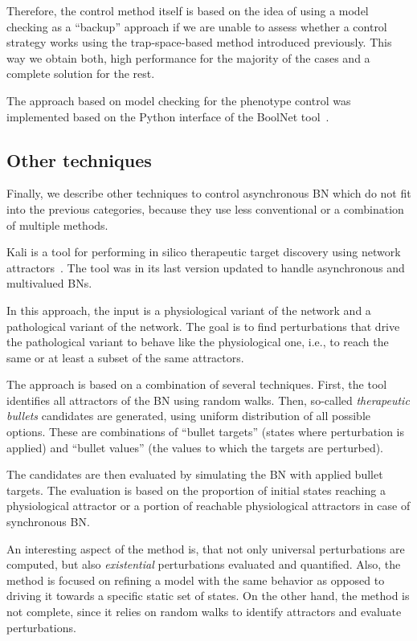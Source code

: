 Therefore, the control method itself is based on the idea of using a model checking as a ``backup'' approach if we are unable to assess whether a control strategy works using the trap-space-based method introduced previously. This way we obtain both, high performance for the majority of the cases and a complete solution for the rest.

The approach based on model checking for the phenotype control was implemented based on the Python interface of the BoolNet tool~\cite{Klarner2018}.

\subsection{Other techniques}
Finally, we describe other techniques to control asynchronous BN which do not fit into the previous categories, because they use less conventional or a combination of multiple methods.

Kali is a tool for performing in silico therapeutic target discovery using network attractors~\cite{Poret2014,Poret2017,Poret2018}. The tool was in its last version updated to handle asynchronous and multivalued BNs. 

In this approach, the input is a physiological variant of the network and a pathological variant of the network. The goal is to find perturbations that drive the pathological variant to behave like the physiological one, i.e., to reach the same or at least a subset of the same attractors.

The approach is based on a combination of several techniques. First, the tool identifies all attractors of the BN using random walks. Then, so-called \emph{therapeutic bullets} candidates are generated, using uniform distribution of all possible options. These are combinations of ``bullet targets'' (states where perturbation is applied) and ``bullet values'' (the values to which the targets are perturbed).

The candidates are then evaluated by simulating the BN with applied bullet targets. The evaluation is based on the proportion of initial states reaching a physiological attractor or a portion of reachable physiological attractors in case of synchronous BN.

An interesting aspect of the method is, that not only universal perturbations are computed, but also \emph{existential} perturbations evaluated and quantified. Also, the method is focused on refining a model with the same behavior as opposed to driving it towards a specific static set of states. On the other hand, the method is not complete, since it relies on random walks to identify attractors and evaluate perturbations.

